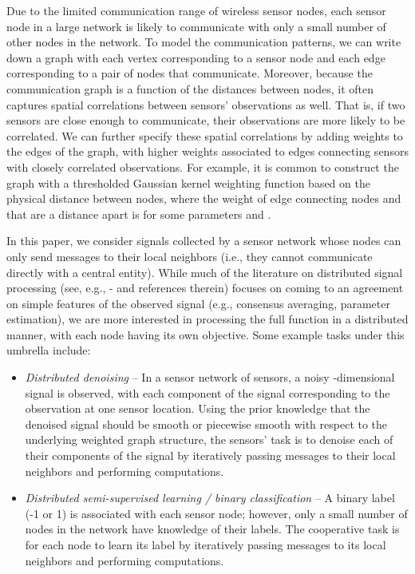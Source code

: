 \documentclass[conference]{IEEEtran}
\begin{document}
Due to the limited communication range of wireless sensor nodes, each sensor node in a large network is likely to communicate with only a small number of other nodes in the network. To model the communication patterns, we can write down a graph with each vertex corresponding to a sensor node and each edge corresponding to a pair of nodes that communicate. Moreover, because the communication graph is a function of the distances between nodes, it often captures spatial correlations between sensors' observations as well.
 That is, if two sensors are close enough to communicate, their observations are more likely to be correlated.
We can further specify these spatial correlations by adding weights to the edges of the graph, with higher weights associated to edges connecting sensors with closely correlated observations. For example,
it is common to construct the graph with
a thresholded Gaussian kernel weighting function based on the physical distance between nodes, where the weight of edge  connecting nodes  and  that are a distance  apart is 
for some parameters  and .

In this paper, we consider signals collected by a sensor network whose nodes can only send messages to their local neighbors
 (i.e., they cannot communicate directly with a central entity). While much of the literature on distributed signal processing (see, e.g., \cite{Rabbat}-\nocite{predd, olfati}\cite{dimakis} and references therein) focuses on coming to an agreement on simple features of the observed signal (e.g., consensus averaging, parameter estimation), we are more interested in processing the full function in a distributed manner, with each node having its own objective.
Some example tasks under this umbrella include:
\begin{itemize}
\item \emph{Distributed denoising} -- In a sensor network of  sensors, a noisy -dimensional signal is observed, with each component of the signal corresponding to the observation at one sensor location. Using the prior knowledge that the denoised signal should be smooth or piecewise smooth with respect to the underlying weighted graph structure, the sensors' task is to denoise each of their components of the signal by iteratively passing messages to their local neighbors and performing computations.
\item \emph{Distributed semi-supervised learning / binary classification} -- A binary label (-1 or 1) is associated with each sensor node; however, only a small number of nodes in the network have knowledge of their labels. The cooperative task is for each node to learn its label by iteratively passing messages to its local neighbors and performing computations.
\end{itemize}
\end{document}
